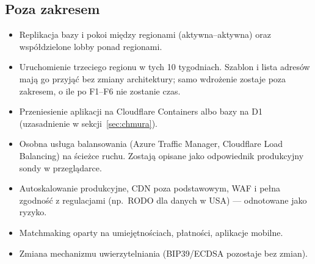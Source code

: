 \documentclass[12pt,a4paper]{article}
\begin{document}
\subsection{Poza zakresem}
\begin{itemize}
  \item Replikacja bazy i pokoi między regionami (aktywna--aktywna) oraz
        współdzielone lobby ponad regionami.
  \item Uruchomienie trzeciego regionu w tych 10 tygodniach. Szablon i lista
        adresów mają go przyjąć bez zmiany architektury; samo wdrożenie zostaje
        poza zakresem, o ile po F1--F6 nie zostanie czas.
  \item Przeniesienie aplikacji na Cloudflare Containers albo bazy na D1
        (uzasadnienie w sekcji~\ref{sec:chmura}).
  \item Osobna usługa balansowania (Azure Traffic Manager, Cloudflare Load
        Balancing) na ścieżce ruchu. Zostają opisane jako odpowiednik produkcyjny
        sondy w przeglądarce.
  \item Autoskalowanie produkcyjne, CDN poza podstawowym, WAF i pełna zgodność
        z regulacjami (np.\ RODO dla danych w USA) --- odnotowane jako ryzyko.
  \item Matchmaking oparty na umiejętnościach, płatności, aplikacje mobilne.
  \item Zmiana mechanizmu uwierzytelniania (BIP39/ECDSA pozostaje bez zmian).
\end{itemize}

\end{document}
